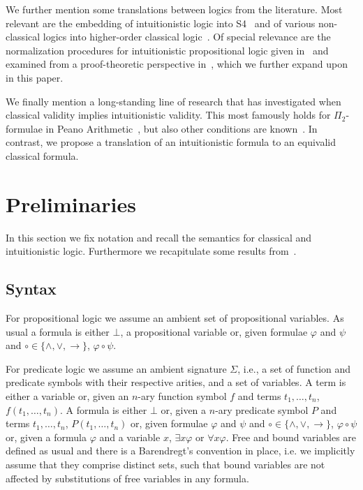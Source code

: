 \documentclass{easychair}
\theoremstyle{definition}
\theoremstyle{definition}
\theoremstyle{definition}
\theoremstyle{definition}
\theoremstyle{definition}
\theoremstyle{definition}
\theoremstyle{definition}
\begin{document}
We further mention some translations between logics from the literature.
Most relevant are the embedding of intuitionistic logic into S4~\cite{basicprooftheory} and of various non-classical logics into higher-order classical logic~\cite{LEO,wisniewski2016tptp}.
Of special relevance are the normalization procedures for intuitionistic propositional logic given in~\cite{claessen2015sat}
and examined from a proof-theoretic perspective in~\cite{fiorentini2019proof}, which we further expand upon in this paper.

We finally mention a long-standing line of research that has investigated when classical validity implies intuitionistic validity.
This most famously holds for $\Pi_2$-formulae in Peano Arithmetic~\cite{friedman1978classically}, but also other conditions are known~\cite{schwichtenberg}.
In contrast, we propose a translation of an intuitionistic formula to an equivalid classical formula.


\section{Preliminaries}

In this section we fix notation and recall the semantics for classical and intuitionistic logic. Furthermore we recapitulate some results from~\cite{otten2005clausal}.

\subsection{Syntax}

For propositional logic we assume an ambient set of propositional variables. As usual a formula is either $\bot$, a propositional variable or, given formulae $\varphi$ and $\psi$ and $\circ\in\{\wedge, \vee,\to\}$, $\varphi\circ\psi$.

For predicate logic we assume an ambient signature $\Sigma$, i.e., a set of function and predicate symbols with their respective arities, and a set of variables. A term is either a variable or, given an $n$-ary function symbol $f$ and terms $t_1, \ldots, t_n$, $f(t_1, \ldots, t_n)$. A formula is either $\bot$ or, given a $n$-ary predicate symbol $P$ and terms $t_1, \ldots, t_n$, $P(t_1, \ldots, t_n)$ or, given formulae $\varphi$ and $\psi$ and $\circ\in\{\wedge, \vee,\to\}$, $\varphi\circ\psi$ or, given a formula $\varphi$ and a variable $x$, $\exists x\varphi$ or $\forall x\varphi$. Free and bound variables are defined as usual and there is a Barendregt's convention in place, i.e. we implicitly assume that they comprise distinct sets, such that bound variables are not affected by substitutions of free variables in any formula.
\end{document}
